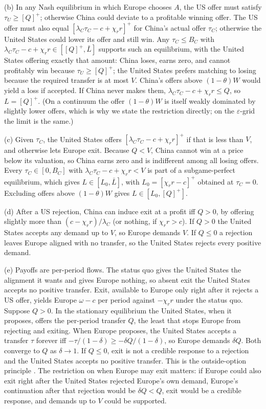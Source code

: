 (b) In any Nash equilibrium in which Europe chooses $A$, the US offer must satisfy $\tau_U \geq [Q]^+$; otherwise China could deviate to a profitable winning offer. The US offer must also equal $[\lambda_C\tau_C - c + \chi_r r]^+$ for China's actual offer $\tau_C$; otherwise the United States could lower its offer and still win. Any $\tau_C \leq B_C$ with $\lambda_C\tau_C - c + \chi_r r \in [[Q]^+, \bar L]$ supports such an equilibrium, with the United States offering exactly that amount: China loses, earns zero, and cannot profitably win because $\tau_U \geq [Q]^+$; the United States prefers matching to losing because the required transfer is at most $V$. China's offers above $(1-\theta)W$ would yield a loss if accepted. If China never makes them, $\lambda_C\tau_C - c + \chi_r r \leq Q$, so $L = [Q]^+$. (On a continuum the offer $(1-\theta)W$ is itself weakly dominated by slightly lower offers, which is why we state the restriction directly; on the $\varepsilon$-grid the limit is the same.)

(c) Given $\tau_C$, the United States offers $[\lambda_C\tau_C - c + \chi_r r]^+$ if that is less than $V$, and otherwise lets Europe exit. Because $Q< V$, China cannot win at a price below its valuation, so China earns zero and is indifferent among all losing offers. Every $\tau_C \in [0,B_C]$ with $\lambda_C\tau_C - c + \chi_r r < V$ is part of a subgame-perfect equilibrium, which gives $L \in [L_0, \bar L]$, with $L_0 = [\chi_r r - c]^+$ obtained at $\tau_C=0$. Excluding offers above $(1-\theta)W$ gives $L \in [L_0, [Q]^+]$.

(d) After a US rejection, China can induce exit at a profit iff $Q>0$, by offering slightly more than $(c-\chi_r r)/\lambda_C$ (or nothing, if $\chi_r r > c$). If $Q>0$ the United States accepts any demand up to $V$, so Europe demands $V$. If $Q\leq 0$ a rejection leaves Europe aligned with no transfer, so the United States rejects every positive demand.

(e) Payoffs are per-period flows. The status quo gives the United States the alignment it wants and gives Europe nothing, so absent exit the United States accepts no positive transfer. Exit, available to Europe only right after it rejects a US offer, yields Europe $\omega - c$ per period against $-\chi_r r$ under the status quo. Suppose $Q>0$. In the stationary equilibrium the United States, when it proposes, offers the per-period transfer $Q$, the least that stops Europe from rejecting and exiting. When Europe proposes, the United States accepts a transfer $\tau$ forever iff $-\tau/(1-\delta) \geq -\delta Q/(1-\delta)$, so Europe demands $\delta Q$. Both converge to $Q$ as $\delta\to 1$. If $Q\leq 0$, exit is not a credible response to a rejection and the United States accepts no positive transfer. This is the outside-option principle \citep{shaked1984involuntary, sutton1986noncooperative}. The restriction on when Europe may exit matters: if Europe could also exit right after the United States rejected Europe's own demand, Europe's continuation after that rejection would be $\delta Q < Q$, exit would be a credible response, and demands up to $V$ could be supported.

